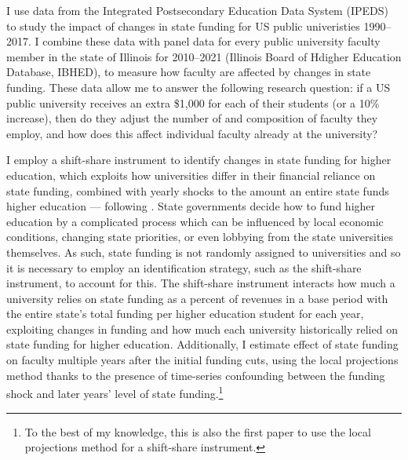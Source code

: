 I use data from the Integrated Postsecondary Education Data System (IPEDS) to study the impact of changes in state funding for US public univeristies 1990--2017.
I combine these data with panel data for every public university faculty member in the state of Illinois for 2010--2021 (Illinois Board of Hdigher Education Database, IBHED), to measure how faculty are affected by changes in state funding.
These data allow me to answer the following research question: if a US public university receives an extra \$1,000 for each of their students (or a 10\% increase), then do they adjust the number of and composition of faculty they employ, and how does this affect individual faculty already at the university?

I employ a shift-share instrument to identify changes in state funding for higher education, which exploits how universities differ in their financial reliance on state funding, combined with yearly shocks to the amount an entire state funds higher education --- following \cite{NBERw23736,NBERw27885}.
State governments decide how to fund higher education by a complicated process which can be influenced by local economic conditions, changing state priorities, or even lobbying from the state universities themselves.
As such, state funding is not randomly assigned to universities and so it is necessary to employ an identification strategy, such as the shift-share instrument, to account for this.
The shift-share instrument interacts how much a university relies on state funding as a percent of revenues in a base period with the entire state's total funding per higher education student for each year, exploiting changes in funding and how much each university historically relied on state funding for higher education.
Additionally, I estimate effect of state funding on faculty multiple years after the initial funding cuts, using the local projections method thanks to the presence of time-series confounding between the funding shock and later years' level of state funding.\footnote{
    To the best of my knowledge, this is also the first paper to use the local projections method for a shift-share instrument.
}

